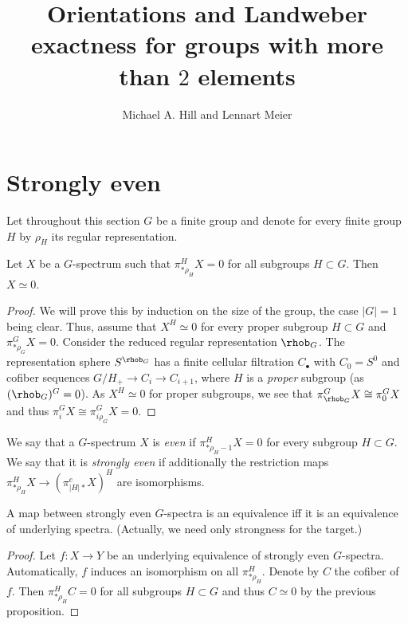 \documentclass[11pt]{article}
\begin{document}
\title{Orientations and Landweber exactness for groups with more than $2$ elements}
\author{Michael A. Hill and Lennart Meier}
\maketitle


\section{Strongly even}
Let throughout this section $G$ be a finite group and denote for every finite group $H$ by $\rho_H$ its regular representation. 
\begin{prop}
Let $X$ be a $G$-spectrum such that $\pi^H_{*\rho_H}X = 0$ for all subgroups $H\subset G$. Then $X \simeq 0$. 
\end{prop}
\begin{proof}
We will prove this by induction on the size of the group, the case $|G| = 1$ being clear. Thus, assume that $X^H \simeq 0$ for every proper subgroup $H\subset G$ and $\pi^G_{*\rho_G} X = 0$. Consider the reduced regular representation $\rhob_G$. The representation sphere $S^{\rhob_G}$ has a finite cellular filtration $C_\bullet$ with $C_0 = S^0$ and cofiber sequences $G/H_+ \to C_i \to C_{i+1}$, where $H$ is a \emph{proper} subgroup (as $(\rhob_G)^G = 0$). As $X^H \simeq 0$ for proper subgroups, we see that $\pi^G_{\rhob_G}X \cong \pi^G_0X$ and thus $\pi_i^GX \cong \pi^G_{i\rho_G}X = 0$. 
\end{proof}

\begin{defi}
We say that a $G$-spectrum $X$ is \emph{even} if $\pi^H_{*\rho_H-1}X = 0$ for every subgroup $H\subset G$. We say that it is \emph{strongly even} if additionally the restriction maps $\pi^H_{*\rho_H}X \to (\pi_{|H|*}^eX)^H$ are isomorphisms. 
\end{defi}

\begin{prop}
A map between strongly even $G$-spectra is an equivalence iff it is an equivalence of underlying spectra. (Actually, we need only strongness for the target.)
\end{prop}
\begin{proof}
Let $f\colon X \to Y$ be an underlying equivalence of strongly even $G$-spectra. Automatically, $f$ induces an isomorphism on all $\pi^H_{*\rho_H}$. Denote by $C$ the cofiber of $f$. Then $\pi^H_{*\rho_H}C = 0$ for all subgroups $H\subset G$ and thus $C\simeq 0$ by the previous proposition. 
\end{proof}
\end{document}
